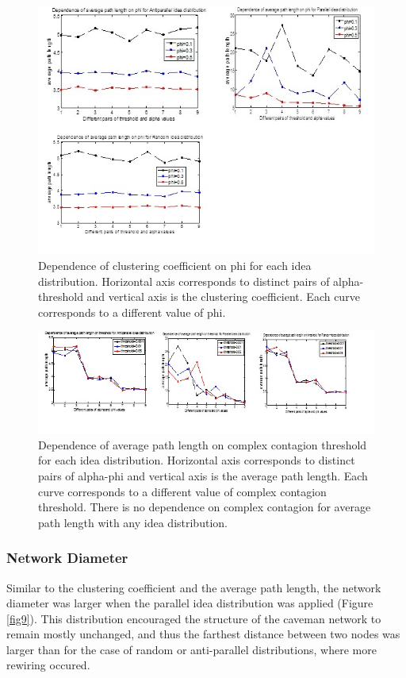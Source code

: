 \begin{figure}
[htp]
\begin{center}
\includegraphics{Fig14}
\end{center}
\caption {Dependence of clustering coefficient on phi for each idea distribution. Horizontal axis corresponds to distinct pairs of alpha-     threshold and   vertical axis is the clustering coefficient. Each curve corresponds to a different value of phi.}
\label {fig14}
\end{figure}

\begin{figure}
[htp]
\begin{center}
\includegraphics{Fig17}
\end{center}
\caption{ Dependence of average path length on complex contagion threshold for each idea distribution. Horizontal axis corresponds to distinct pairs of alpha-phi and vertical axis is the average path length. Each curve corresponds to a different value of complex contagion threshold. There is no dependence on complex contagion for average path length with any idea distribution.}
\label {fig17}
\end{figure}


\subsubsection{Network Diameter}
Similar to the clustering coefficient and the average path length, the network diameter was larger when the parallel idea distribution was applied (Figure \ref{fig9}). This distribution encouraged the structure of the caveman network to remain mostly unchanged, and thus the farthest distance between two nodes was larger than for the case of random or anti-parallel distributions, where more rewiring occured. 

